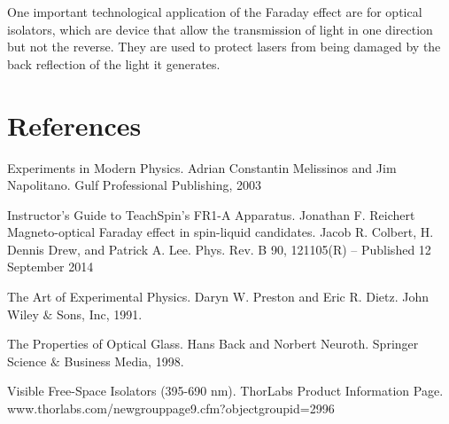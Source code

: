 \documentclass[prb,preprint]{revtex4-1}
\begin{document}
{One important technological application of the Faraday effect are for optical isolators, which are device that allow the transmission of light in one direction but not the reverse. They are used to protect lasers from being damaged by the back reflection of the light it generates.\cite{optical}
}

\section{References}

\begin{thebibliography}{4}
 Experiments in Modern Physics.  Adrian Constantin Melissinos and Jim Napolitano.  Gulf Professional Publishing, 2003

Instructor's Guide to TeachSpin's FR1-A Apparatus.  Jonathan F. Reichert
Magneto-optical Faraday effect in spin-liquid candidates.  Jacob R. Colbert, H. Dennis Drew, and Patrick A. Lee.  Phys. Rev. B 90, 121105(R) – Published 12 September 2014

The Art of Experimental Physics.  Daryn W. Preston and Eric R. Dietz.  John Wiley  $\&$ Sons, Inc, 1991.

 The Properties of Optical Glass.  Hans Back and Norbert Neuroth.  Springer Science $\&$ Business Media, 1998.

 Visible Free-Space Isolators (395-690 nm).  ThorLabs Product Information Page.  www.thorlabs.com/newgrouppage9.cfm?objectgroupid=2996







\end{thebibliography}
\end{document}
